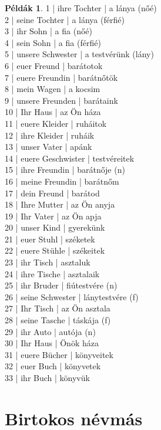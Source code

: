 \documentclass{article}
\theoremstyle{definition}
\newtheorem*{exmp}{Példák}
\begin{document}
\begin{exmp}	%
1 | ihre Tochter | a lánya (nőé)\\
2 | seine Tochter | a lánya (férfié)\\
3 | ihr Sohn | a fia (nőé)\\
4 | sein Sohn | a fia (férfié)\\
5 | unsere Schwester | a testvérünk (lány)\\
6 | euer Freund | barátotok\\
7 | euere Freundin | barátnőtök\\
8 | mein Wagen | a kocsim\\
9 | unsere Freunden | barátaink\\
10 | Ihr Haus | az Ön háza\\
11 | euere Kleider | ruháitok\\
12 | ihre Kleider | ruháik\\
13 | unser Vater | apánk\\
14 | euere Geschwister | testvéreitek\\
15 | ihre Freundin | barátnője (n)\\
16 | meine Freundin | barátnőm\\
17 | dein Freund | barátod\\
18 | Ihre Mutter | az Ön anyja\\
19 | Ihr Vater | az Ön apja\\
20 | unser Kind | gyerekünk\\
21 | euer Stuhl | széketek\\
22 | euere Stühle | székeitek\\
23 | ihr Tisch | asztaluk\\
24 | ihre Tische | asztalaik\\
25 | ihr Bruder | fiútestvére (n)\\
26 | seine Schwester | lánytestvére (f)\\
27 | Ihr Tisch | az Ön asztala\\
28 | seine Tasche | táskája (f)\\
29 | ihr Auto | autója (n)\\
30 | Ihr Haus | Önök háza\\
31 | euere Bücher | könyveitek\\
32 | euer Buch | könyvetek\\
33 | ihr Buch | könyvük\\
\end{exmp}

\section{Birtokos névmás}
\end{document}

